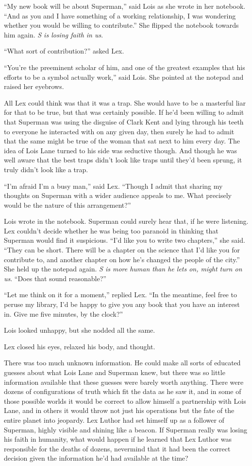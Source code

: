 ``My new book will be about Superman,'' said Lois as she wrote in her
notebook. ``And as you and I have something of a working relationship, I
was wondering whether you would be willing to contribute.'' She flipped
the notebook towards him again. \emph{S is losing faith in us}.

``What sort of contribution?'' asked Lex.

``You're the preeminent scholar of him, and one of the greatest examples
that his efforts to be a symbol actually work,'' said Lois. She pointed
at the notepad and raised her eyebrows.

All Lex could think was that it was a trap. She would have to be a
masterful liar for that to be true, but that was certainly possible. If
he'd been willing to admit that Superman was using the disguise of Clark
Kent and lying through his teeth to everyone he interacted with on any
given day, then surely he had to admit that the same might be true of
the woman that sat next to him every day. The idea of Lois Lane turned
to his side was seductive though. And though he was well aware that the
best traps didn't look like traps until they'd been sprung, it truly
didn't look like a trap.

``I'm afraid I'm a busy man,'' said Lex. ``Though I admit that sharing
my thoughts on Superman with a wider audience appeals to me. What
precisely would be the nature of this arrangement?''

Lois wrote in the notebook. Superman could surely hear that, if he were
listening. Lex couldn't decide whether he was being too paranoid in
thinking that Superman would find it suspicious. ``I'd like you to write
two chapters,'' she said. ``They can be short. There will be a chapter
on the science that I'd like you for contribute to, and another chapter
on how he's changed the people of the city.'' She held up the notepad
again. \emph{S is more human than he lets on, might turn on us}. ``Does
that sound reasonable?''

``Let me think on it for a moment,'' replied Lex. ``In the meantime,
feel free to peruse my library, I'd be happy to give you any book that
you have an interest in. Give me five minutes, by the clock?''

Lois looked unhappy, but she nodded all the same.

Lex closed his eyes, relaxed his body, and thought.

There was too much unknown information. He could make all sorts of
educated guesses about what Lois Lane and Superman knew, but there was
so little information available that these guesses were barely worth
anything. There were dozens of configurations of truth which fit the
data as he saw it, and in some of those possible worlds it would be
correct to allow himself a partnership with Lois Lane, and in others it
would throw not just his operations but the fate of the entire planet
into jeopardy. Lex Luthor had set himself up as a follower of Superman,
highly visible and shining like a beacon. If Superman really was losing
his faith in humanity, what would happen if he learned that Lex Luthor
was responsible for the deaths of dozens, nevermind that it had been the
correct decision given the information he'd had available at the time?

